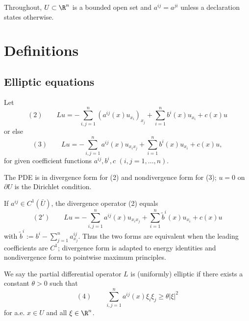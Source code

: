 
Throughout, $U\subset\R^n$ is a bounded open set and $a^{ij}=a^{ji}$ unless a declaration states otherwise.

\section{Definitions}
\label{sec:elliptic-equations-definitions}

\subsection{Elliptic equations}

\begin{definition}
\label{def:divergence-nondivergence-form}
Let
$$(2) \qquad Lu = -\sum_{i,j=1}^n \left(a^{ij}(x)u_{x_i}\right)_{x_j} + \sum_{i=1}^n b^i(x)u_{x_i} + c(x)u$$
or else
$$(3) \qquad Lu = -\sum_{i,j=1}^n a^{ij}(x)u_{x_ix_j} + \sum_{i=1}^n b^i(x)u_{x_i} + c(x)u,$$
for given coefficient functions $a^{ij}, b^i, c$ $(i,j=1,\ldots,n)$.

The PDE is in divergence form for (2) and nondivergence form for (3); $u=0$ on $\partial U$ is the Dirichlet condition.
\end{definition}

\begin{remark}
\label{rem:elliptic-operator-form-conversion}
If $a^{ij}\in C^1(\bar U)$, the divergence operator (2) equals
$$(2') \qquad Lu = -\sum_{i,j=1}^n a^{ij}(x)u_{x_ix_j} + \sum_{i=1}^n \tilde b^i(x)u_{x_i} + c(x)u$$
with $\tilde b^i := b^i - \sum_{j=1}^n a^{ij}_{x_j}$. Thus the two forms are equivalent when the leading coefficients are $C^1$; divergence form is adapted to energy identities and nondivergence form to pointwise maximum principles.
\end{remark}

\begin{definition}
\label{def:uniform-ellipticity}
We say the partial differential operator $L$ is (uniformly) elliptic if there exists a constant $\theta > 0$ such that
$$(4) \qquad \sum_{i,j=1}^n a^{ij}(x)\xi_i\xi_j \geq \theta|\xi|^2$$
for a.e. $x \in U$ and all $\xi \in \R^n$.
\end{definition}

